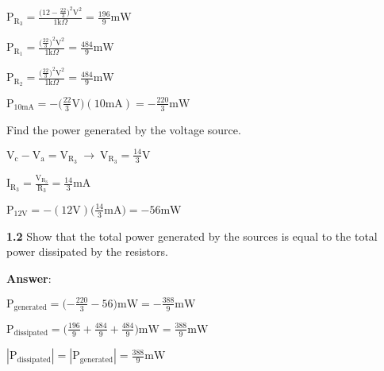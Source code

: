 \documentclass{article}
\begin{document}
\vspace{4mm}

{$\displaystyle \boxed{\text{P}_{\text{R}_3} = \frac{\Big(\displaystyle12-\frac{22}{3}\Big)^2 \text{V}^2}{1 \text{k} \Omega} = \frac{196}{9}\text{mW}}$}

\vspace{4mm}

{$\displaystyle \boxed{\text{P}_{\text{R}_1} = \frac{\Big(\displaystyle\frac{22}{3}\Big)^2 \text{V}^2}{1 \text{k} \Omega} = \frac{484}{9}\text{mW}}$}

\vspace{4mm}

{$\displaystyle \boxed{\text{P}_{\text{R}_2} = \frac{\Big(\displaystyle\frac{22}{3}\Big)^2 \text{V}^2}{1 \text{k} \Omega} = \frac{484}{9}\text{mW}}$}

\vspace{4mm}

{$\displaystyle \boxed{\text{P}_{10\text{mA}} = -\Big(\frac{22}{3}\text{V}\Big)(10\text{mA}) = -\frac{220}{3}\text{mW}}$}

\vspace{8mm}

{Find the power generated by the voltage source.}

\vspace{4mm}

{$\displaystyle \text{V}_{\text{c}} - \text{V}_\text{a} = \text{V}_{\text{R}_3} \ \rightarrow \ \text{V}_{\text{R}_3} = \frac{14}{3}\text{V}$}

\vspace{4mm}

{$\displaystyle \text{I}_{\text{R}_3} = \frac{\text{V}_{\text{R}_3}}{\text{R}_3} = \frac{14}{3}\text{mA}$}

\vspace{4mm}

{$\displaystyle \boxed{\text{P}_{12\text{V}} = -(12\text{V})\Big(\frac{14}{3}\text{mA}\Big) = -56\text{mW}}$}

\vspace{8mm}

{\textbf{1.2} Show that the total power generated by the sources is equal to the total power 
dissipated by the resistors.}

\vspace{4mm}

{\textbf{Answer}:}

\vspace{4mm}

{$\displaystyle \text{P}_\text{generated} = \Big({-\frac{220}{3}}- 56\Big)\text{mW} = -\frac{388}{9}\text{mW}$}

\vspace{4mm}

{$\displaystyle \text{P}_\text{dissipated} = \Big({\frac{196}{9}} + \frac{484}{9}+ \frac{484}{9}\Big)\text{mW} = \frac{388}{9}\text{mW}$}

\vspace{4mm}

{$\displaystyle \boxed{|\text{P}_\text{dissipated}| = |\text{P}_\text{generated}| = \frac{388}{9}\text{mW}}$}

\vspace{8mm}
\end{document}
